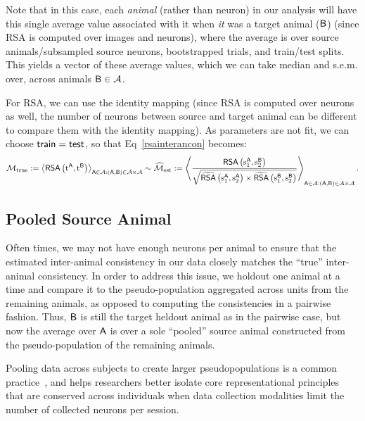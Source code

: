 Note that in this case, each \emph{animal} (rather than neuron) in our analysis will have this single average value associated with it when \emph{it} was a target animal ($\mathsf{B}$) (since RSA is computed over images and neurons), where the average is over source animals/subsampled source neurons, bootstrapped trials, and train/test splits.
This yields a vector of these average values, which we can take median and s.e.m. over, across animals $\mathsf{B} \in \mathcal{A}$.

For RSA, we can use the identity mapping (since RSA is computed over neurons as well, the number of neurons between source and target animal can be different to compare them with the identity mapping). 
As parameters are not fit, we can choose $\operatorname{\mathsf{train}} = \operatorname{\mathsf{test}}$, so that Eq~\eqref{rsainterancon} becomes:
\begin{equation}\label{rsainteranconid}
\mathcal{M}_{\text{true}} := \left\langle\operatorname{\mathsf{RSA}}\left(\operatorname{t^{\mathsf{A}}},\operatorname{t^{\mathsf{B}}}\right)\right\rangle_{\mathsf{A} \in \mathcal{A}: (\mathsf{A},\mathsf{B})\in \mathcal{A}\times\mathcal{A}} \sim \widehat{\mathcal{M}}_{\text{est}} := \left\langle\dfrac{\operatorname{\mathsf{RSA}}\left(\operatorname{s^{\mathsf{A}}_{1}}, \operatorname{s^{\mathsf{B}}_{2}}\right)}{\sqrt{\widetilde{\operatorname{\mathsf{RSA}}}\left(\operatorname{s^{\mathsf{A}}_{1}}, \operatorname{s^{\mathsf{A}}_{2}}\right) \times \widetilde{\operatorname{\mathsf{RSA}}}\left(\operatorname{s^{\mathsf{B}}_{1}}, \operatorname{s^{\mathsf{B}}_{2}}\right)}}\right\rangle_{\mathsf{A} \in \mathcal{A}: (\mathsf{A},\mathsf{B})\in \mathcal{A}\times\mathcal{A}}.
\end{equation}

\subsection{Pooled Source Animal}
\label{ss:methods-interanimal-holdouts}
Often times, we may not have enough neurons per animal to ensure that the estimated inter-animal consistency in our data closely matches the ``true'' inter-animal consistency.
In order to address this issue, we holdout one animal at a time and compare it to the pseudo-population aggregated across units from the remaining animals, as opposed to computing the consistencies in a pairwise fashion.
Thus, $\mathsf{B}$ is still the target heldout animal as in the pairwise case, but now the average over $\mathsf{A}$ is over a sole ``pooled'' source animal constructed from the pseudo-population of the remaining animals.

Pooling data across subjects to create larger pseudopopulations is a common practice~\citep{rust2020understanding}, and helps researchers better isolate core representational principles that are conserved across individuals when data collection modalities limit the number of collected neurons per session.

